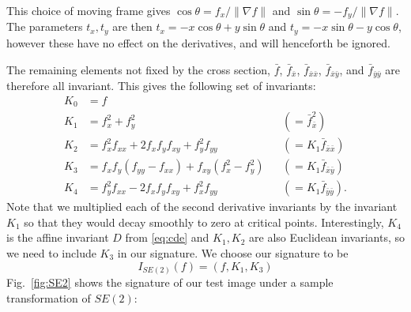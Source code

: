 \documentclass[review,onefignum,onetabnum]{siamonline190516}
\begin{document}
This choice of moving frame gives $\cos\theta = f_x/\lVert\nabla f\rVert$
and $\sin\theta = -f_y/\lVert \nabla f \rVert$. The parameters $t_x, t_y$
are then $t_x = -x\cos\theta + y\sin\theta$ and $t_y = -x\sin\theta -
y\cos\theta$, however these have no effect on the derivatives, and will
henceforth be ignored.

The remaining elements not fixed by the cross section, $\bar{f}$,
$\bar{f}_{\bar{x}}$, $\bar{f}_{\bar{x}\bar{x}}$,
$\bar{f}_{\bar{x}\bar{y}}$, and $\bar{f}_{\bar{y}\bar{y}}$ are therefore
all invariant. This gives the following set of invariants:
\begin{equation}\label{eq:se2invariants}
\begin{aligned}
  K_0 &= f \\
  K_1 &= f_x^2 + f_y^2 & &(= \bar{f}_{\bar{x}}^2)\\
  K_2 &= f_x^2 f_{xx} + 2 f_x f_y f_{xy} + f_y^2 f_{yy} &&(= K_1\bar{f}_{\bar{x}\bar{x}}) \\
  K_3 &= f_x f_y (f_{yy} - f_{xx}) + f_{xy} (f_x^2 - f_y^2) &&(= K_1\bar{f}_{\bar{x}\bar{y}})\\
  K_4 &= f_y^2 f_{xx} - 2 f_x f_y f_{xy} + f_x^2 f_{yy} &&(= K_1\bar{f}_{\bar{y}\bar{y}}).
\end{aligned}
\end{equation}
Note that we multiplied each of the second derivative invariants by the
invariant $K_1$ so that they would decay smoothly to zero at critical
points.  Interestingly, $K_4$ is the affine invariant $D$ from
\eqref{eq:cde} and $K_1, K_2$ are also Euclidean invariants, so we need to
include $K_3$ in our signature. We choose our signature to be
\begin{equation}
    \label{eq:SE2signature}
    I_{SE(2)}(f) = (f, K_1, K_3)
\end{equation}
Fig.~\ref{fig:SE2} shows the signature of our test image under a sample
transformation of $SE(2)$:
\end{document}
